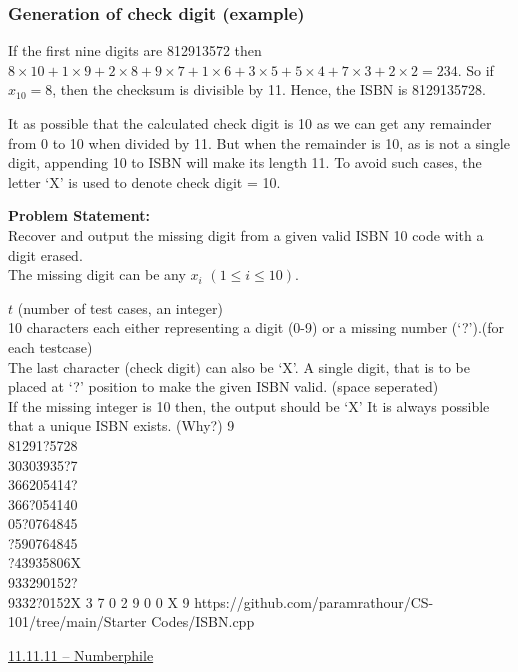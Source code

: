 \subsubsection*{Generation of check digit (example)}
If the first nine digits are 812913572 then $8\times10 + 1\times9 + 2\times8 + 9\times7 + 1\times6 + 3\times5 + 5\times4 + 7\times3 + 2\times2 = 234$. So if $x_{10} = 8$, then the checksum is divisible by 11. Hence, the ISBN is 8129135728.
\begin{note}
It as possible that the calculated check digit is 10 as we can get any remainder from 0 to 10 when divided by 11. But when the remainder is 10, as is not a single digit, appending 10 to ISBN will make its length 11. To avoid such cases, the letter `X' is used to denote check digit = 10.
\end{note}
\textbf{Problem Statement:}\\
Recover and output the missing digit from a given valid ISBN 10 code with a digit erased.\\
The missing digit can be any $x_i$ $(1\leq i\leq 10)$.
\begin{testcases}
	{$t$ \hfill(number of test cases, an integer)\\
	10 characters each either representing a digit (0-9) or a missing number (‘?’).\hfill(for each testcase)\\
	The last character (check digit) can also be `X'.}
	{A single digit, that is to be placed at `?' position to make the given ISBN valid.
 \hfill{(space seperated)}\\
	If the missing integer is 10 then, the output should be `X'}
	{It is always possible that a unique ISBN exists. (Why?)}
	{9\\81291?5728\\30303935?7\\366205414?\\366?054140\\05?0764845\\?590764845\\?43935806X\\933290152?\\9332?0152X}
	{3 7 0 2 9 0 0 X 9}
	{https://github.com/paramrathour/CS-101/tree/main/Starter Codes/ISBN.cpp}
\end{testcases}
\begin{funvideo}
\href{https://youtu.be/sPFWfAxIiwg}{11.11.11 -- Numberphile}
\end{funvideo}